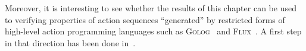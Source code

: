 Moreover, it is interesting to see whether the results of this chapter can be
used to verifying properties of action sequences \enquote{generated} by
restricted forms of high-level action programming languages such as
\textsc{Golog}~\cite{LRL+-JLP97} and \textsc{Flux}~\cite{Thi-TPLP05}.  A first
step in that direction has been done in~\cite{BaZa-FroCoS13}.
